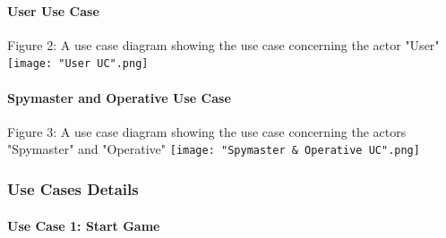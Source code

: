 \documentclass[10pt, a4paper]{article}
\begin{document}
		    \clearpage
		
			\paragraph{User Use Case}
			
			\begin{center}
				Figure 2: A use case diagram showing the use case concerning the actor "User"
				\texttt{[image: "User UC".png]}
			\end{center} 
			
			\paragraph{Spymaster and Operative Use Case}
			
			\begin{center}
				Figure 3: A use case diagram showing the use case concerning the actors "Spymaster" and "Operative"
				\texttt{[image: "Spymaster \& Operative UC".png]}
			\end{center}
		\pagebreak
		\subsubsection{Use Cases Details}
		
			\paragraph{Use Case 1: Start Game }
			
\end{document}
